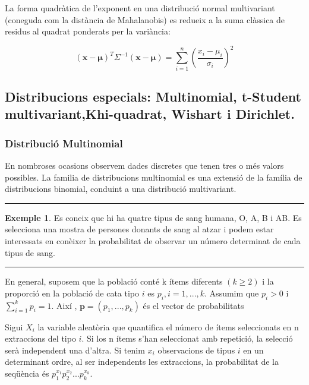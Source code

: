 \documentclass[
  catalan,
]{article}
\theoremstyle{definition}
\theoremstyle{definition}
\newtheorem{example}{Exemple}[section]
\theoremstyle{definition}
\theoremstyle{definition}
\theoremstyle{remark}
\begin{document}
La forma quadràtica de l'exponent en una distribució normal multivariant (coneguda com la distància de Mahalanobis) es redueix a la suma clàssica de residus al quadrat ponderats per la variància:

\[
(\mathbf{x} - \boldsymbol{\mu})^T \Sigma^{-1} (\mathbf{x} - \boldsymbol{\mu}) = \sum_{i=1}^n \left(\frac{x_i - \mu_i}{\sigma_i}\right)^2
\]

\subsection{Distribucions especials: Multinomial, t-Student multivariant,Khi-quadrat, Wishart i Dirichlet.}\label{distribucions-especials-multinomial-t-student-multivariantkhi-quadrat-wishart-i-dirichlet.}

\subsubsection{Distribució Multinomial}\label{distribuciuxf3-multinomial}

En nombroses ocasions observem dades discretes que tenen tres o més valors possibles. La familia de distribucions multinomial es una extensió de la família de distribucions binomial, conduint a una distribució multivariant.

\begin{center}\rule{0.5\linewidth}{0.5pt}\end{center}

\begin{example}
\protect\hypertarget{exm:multinomial}{}\label{exm:multinomial}Es coneix que hi ha quatre tipus de sang humana, O, A, B i AB. Es selecciona una mostra de persones donants de sang al atzar i podem estar interessats en conèixer la probabilitat de observar un número determinat de cada tipus de sang.
\end{example}

\begin{center}\rule{0.5\linewidth}{0.5pt}\end{center}

En general, suposem que la població conté k ítems diferents \((k \geq 2)\) i la proporció en la població de cata tipo \(i\) es \(p_i, i=1,...,k\). Assumim que \(p_i>0\) i \(\sum_{i=1}^k p_i=1\). Així , \(\mathbf{p}=(p_1,...,p_k)\) és el vector de probabilitats

Sigui \(X_i\) la variable aleatòria que quantifica el número de ítems seleccionats en n extraccions del tipo \(i\). Si los n ítems s'han seleccionat amb repetició, la selecció serà independent una d'altra. Si tenim \(x_i\) observacions de tipus \(i\) en un determinant ordre, al ser independents les extraccions, la probabilitat de la seqüència és \(p_1^{x_1}p_2^{x_2}...p_k^{x_k}\).
\end{document}
